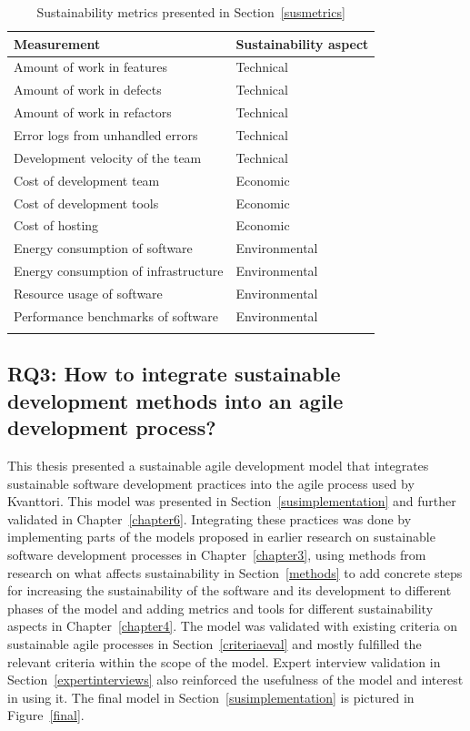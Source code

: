 \begin{longtable}{ |p{}|p{}| }
\hline
\textbf{Measurement} & \textbf{Sustainability aspect}\\
\hline
Amount of work in features & Technical\\
\hline
Amount of work in defects & Technical\\
\hline
Amount of work in refactors & Technical\\
\hline
Error logs from unhandled errors & Technical\\
\hline
Development velocity of the team & Technical\\
\hline
Cost of development team & Economic\\
\hline
Cost of development tools & Economic\\
\hline
Cost of hosting & Economic\\
\hline
Energy consumption of software & Environmental\\
\hline
Energy consumption of infrastructure & Environmental\\
\hline
Resource usage of software & Environmental\\
\hline
Performance benchmarks of software & Environmental\\
\hline
\caption{Sustainability metrics presented in Section~\ref{susmetrics}}
\label{measurements}
\end{longtable}

\subsection{RQ3: How to integrate sustainable development methods into an agile development process?}
This thesis presented a sustainable agile development model that integrates sustainable software development practices into the agile process used by Kvanttori. This model was presented in Section~\ref{susimplementation} and further validated in Chapter~\ref{chapter6}. Integrating these practices was done by implementing parts of the models proposed in earlier research on sustainable software development processes in Chapter~\ref{chapter3}, using methods from research on what affects sustainability in Section~\ref{methods} to add concrete steps for increasing the sustainability of the software and its development to different phases of the model and adding metrics and tools for different sustainability aspects in Chapter~\ref{chapter4}. The model was validated with existing criteria on sustainable agile processes in Section~\ref{criteriaeval} and mostly fulfilled the relevant criteria within the scope of the model. Expert interview validation in Section~\ref{expertinterviews} also reinforced the usefulness of the model and interest in using it. The final model in Section~\ref{susimplementation} is pictured in Figure~\ref{final}.

